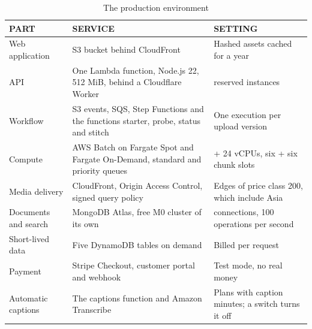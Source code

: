 \begin{table}[H]
\centering
\caption{The production environment}
\label{tab:deployed-environment}
\small
\begin{tabularx}{\textwidth}{>{\raggedright\arraybackslash}p{} >{\raggedright\arraybackslash}X >{\raggedright\arraybackslash}p{}}
\toprule
\textbf{PART} & \textbf{SERVICE} & \textbf{SETTING} \\
\midrule
Web application & S3 bucket behind CloudFront & Hashed assets cached for a year \\
API & One Lambda function, Node.js 22, 512 MiB, behind a Cloudflare Worker & 80 reserved instances \\
Workflow & S3 events, SQS, Step Functions and the functions starter, probe, status and stitch & One execution per upload version \\
Compute & AWS Batch on Fargate Spot and Fargate On-Demand, standard and priority queues & 24 + 24 vCPUs, six + six chunk slots \\
Media delivery & CloudFront, Origin Access Control, signed query policy & Edges of price class 200, which include Asia \\
Documents and search & MongoDB Atlas, free M0 cluster of its own & 500 connections, 100 operations per second \\
Short-lived data & Five DynamoDB tables on demand & Billed per request \\
Payment & Stripe Checkout, customer portal and webhook & Test mode, no real money \\
Automatic captions & The captions function and Amazon Transcribe & Plans with caption minutes; a switch turns it off \\
\bottomrule
\end{tabularx}
\end{table}

